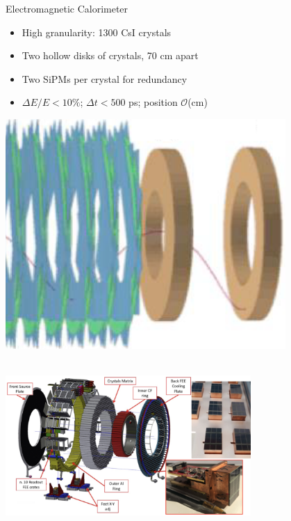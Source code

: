 \documentclass[10pt]{beamer}
\begin{document}
%
\begin{frame}{Electromagnetic Calorimeter}
\begin{minipage}{.65\textwidth}
\begin{itemize}
\setlength\itemsep{0.3cm}
\item High granularity: 1300 CsI crystals 
\item Two hollow disks of crystals, 70 cm apart
\item Two SiPMs per crystal for redundancy
\item $\Delta E/E<10\%$; $\Delta t<500$ ps; position $\mathcal{O}$(cm)
\end{itemize}
\end{minipage}
\begin{minipage}{0.34\textwidth}
\centering
\includegraphics[width=0.8\textwidth]{mu2e_calorimeter_disk_space}
\end{minipage}\\
\vspace{0.2cm}
\centering
\includegraphics[width=0.7\textwidth]{mu2e_calorimeter_disk_2}
\end{frame}
\end{document}
